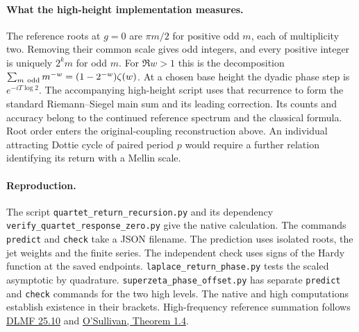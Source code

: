 \documentclass[11pt]{article}
\begin{document}
\paragraph{What the high-height implementation measures.}
The reference roots at $g=0$ are $\pi m/2$ for positive odd $m$, each
of multiplicity two. Removing their common scale gives odd integers, and
every positive integer is uniquely $2^k m$ for odd $m$. For
$\Re w>1$ this is the decomposition
$\sum_{m\ {\rm odd}}m^{-w}=(1-2^{-w})\zeta(w)$.
At a chosen base height the dyadic phase step is $e^{-iT\log2}$.
The accompanying high-height script uses that recurrence to form the
standard Riemann--Siegel main sum and its leading correction.
Its counts and accuracy belong to the continued reference spectrum and the
classical formula. Root order enters the original-coupling reconstruction
above. An individual attracting Dottie cycle of paired period $p$ would
require a further relation identifying its return with a Mellin scale.

\paragraph{Reproduction.}
The script \texttt{quartet\_return\_recursion.py} and its dependency
\texttt{verify\_quartet\_response\_zero.py} give the native calculation.
The commands \texttt{predict} and \texttt{check} take a JSON filename.
The prediction uses isolated roots, the jet weights and the finite series.
The independent check uses signs of the Hardy function at the saved endpoints.
\texttt{laplace\_return\_phase.py} tests the scaled asymptotic by
quadrature. \texttt{superzeta\_phase\_offset.py} has separate
\texttt{predict} and \texttt{check} commands for the two high levels.
The native and high computations establish existence in their brackets.
High-frequency reference summation follows
\href{https://dlmf.nist.gov/25.10}{DLMF 25.10} and
\href{https://arxiv.org/abs/1811.01130}{O'Sullivan, Theorem 1.4}.
\end{document}
